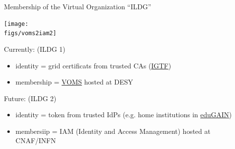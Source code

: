 \documentclass[aspectratio=169,xcolor=dvipsnames]{beamer}
\newcommand{\bi}{\begin{itemize}}
\newcommand{\ei}{\end{itemize}}
\def\figs{figs3}
\begin{document}
\begin{frame}{Membership of the Virtual Organization ``ILDG''}

  \begin{center}
    \texttt{[image: \\figs/voms2iam2]}
    \hspace*{19mm}
  \end{center}

  \vspace*{-3mm}
  Currently: (ILDG 1)
  \bi
  \item identity = grid certificats from \alert{trusted CAs} (\href{https://www.igtf.net/}{IGTF})
  \item membership = \href{https://grid-voms.desy.de:8443/voms/ildg/}{VOMS} hosted at DESY
  \ei

  \vspace*{3mm}
  Future: (ILDG 2)
  \bi
  \item identity = token from \alert{trusted IdPs} (e.g. home institutions in \href{https://technical.edugain.org/}{eduGAIN})
  \item membersiip = IAM (Identity and Access Management) hosted at CNAF/INFN
  \ei

\end{frame}
   
\end{document}
